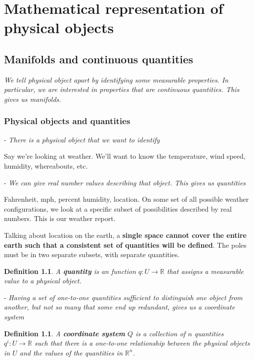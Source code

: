 \documentclass{book}
\newtheorem{defn}[equation]{Definition}
\begin{document}
\tableofcontents

\chapter{Mathematical representation of physical objects}



\section{Manifolds and continuous quantities}
\emph{We tell physical object apart by identifying some measurable properties. In particular, we are interested in properties that are continuous quantities. This gives us manifolds.}

\subsection{Physical objects and quantities}

- \emph{There is a physical object that we want to identify}

Say we're looking at weather. We'll want to know the temperature, wind speed, humidity, whereabouts, etc.

- \emph{We can give real number values describing that object. This gives us quantities}

Fahrenheit, mph, percent humidity, location.
On some set of all possible weather configurations, we look at a specific subset of possibilities described by real numbers. This is our weather report.  

Talking about location on the earth, a \textbf{single space cannot cover the entire earth such that a consistent set of quantities will be defined}. The poles must be in two separate subsets, with separate quantities. 

\begin{defn}
	A \textbf{quantity} is an function $q : U \to \mathbb{R}$ that assigns a measurable value to a physical object.
\end{defn}


- \emph{Having a set of one-to-one quantities sufficient to distinguish one object from another, but not so many that some end up redundant, gives us a coordinate system}


\begin{defn}
	A \textbf{coordinate system} $Q$ is a collection of $n$ quantities $q^i : U \to \mathbb{R}$ such that there is a one-to-one relationship between the physical objects in $U$ and the values of the quantities in $\mathbb{R}^n$.
\end{defn}
\end{document}
